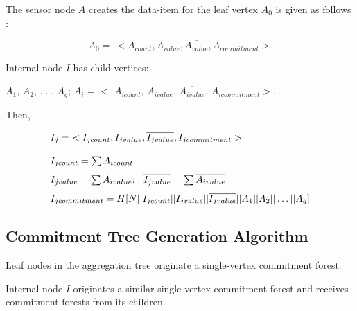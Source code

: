 \documentclass[%
  slidesonly,%
  semlayer%
  ]{seminar}                                  %
\begin{document}
\begin{slide}
      The sensor node $A$ creates the data-item for the leaf vertex $A_{0}$ is given as follows :
      \begin{tiny}
      \begin{equation*}
        A_{0} =\ <A_{count}, A_{value}, \overline{A_{value}}, A_{commitment}>
      \end{equation*}
      \end{tiny}
      \vspace{0.1in}
      Internal node $I$ has child vertices:
      \begin{tiny}
       $A_{1}$, $A_{2}$, $\dotsc$ , $A_{q}$; $A_{i}$ = $<$ $A_{icount}$, $A_{ivalue}$, $\overline{A_{ivalue}}$, $A_{icommitment}$$>$.
      \end{tiny}
      Then,
      \begin{tiny}
        \begin{equation*}
          \begin{array}{l}
            
            I_{j} =\ <I_{jcount}, I_{jvalue}, \overline{I_{jvalue}}, I_{jcommitment}>\\
            \\
            \vspace{0.1in}
            
            I_{jcount} = \sum A_{icount}\\
            \vspace{0.1in}

            I_{jvalue} = \sum A_{ivalue} ; \hspace{0.1in} \overline{I_{jvalue}} = \sum \overline{A_{ivalue}}\\
            
            I_{jcommitment} = H[N||I_{jcount}||I_{jvalue}||\overline{I_{jvalue}}||A_{1}||A_{2}|| \dotsc ||A_{q}]\\
          \end{array}
        \end{equation*}
      \end{tiny}
      
      \vfill
      \clearpage

    \subsection*{Commitment Tree Generation Algorithm}
      \vfill
      Leaf nodes in the aggregation tree originate a single-vertex commitment forest.

      Internal node $I$ originates a similar single-vertex commitment forest and receives commitment forests from its children.
      

\end{slide}
\end{document}
